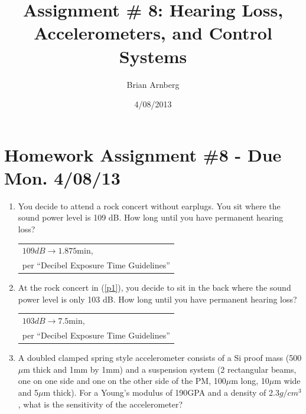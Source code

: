 \documentclass{article}
\title{Assignment \# 8: Hearing Loss, Accelerometers, and Control Systems}
\date{4/08/2013}
\author{Brian Arnberg}
\begin{document}
\label{start}



\section*{ Homework Assignment \#8 - Due Mon. 4/08/13 }
\renewcommand{\labelenumi}{\arabic{enumi})}
\begin{multicols}{2}
\begin{enumerate}
\item\label{p1}
 You decide to attend a rock concert without earplugs. You sit where the sound
     power level is 109 dB. How long until you have permanent hearing loss?

		\begin{tabular}{ l }
			$109dB \rightarrow 1.875\text{min}$,\\
			per ``Decibel Exposure Time Guidelines''
		\end{tabular}
\item\label{p2}
At the rock concert in (\ref{p1}), you decide to sit in the back where the sound power
     level is only 103 dB. How long until you have permanent hearing loss?
	
		\begin{tabular}{ l }
			$103dB \rightarrow 7.5\text{min}$,\\
			per ``Decibel Exposure Time Guidelines''
		\end{tabular}
  
\item\label{p3}
 A doubled clamped spring style accelerometer consists of a Si proof mass (500$\mu$m
     thick and 1mm by 1mm) and a suspension system (2 rectangular beams, one on
     one side and one on the other side of the PM, 100$\mu$m long, 10$\mu$m wide and 5$\mu$m
     thick). For a Young's modulus of 190GPA and a density of 2.3$g/cm^3$, what is the
     sensitivity of the accelerometer?


\end{enumerate}
\end{multicols}
\end{document}
